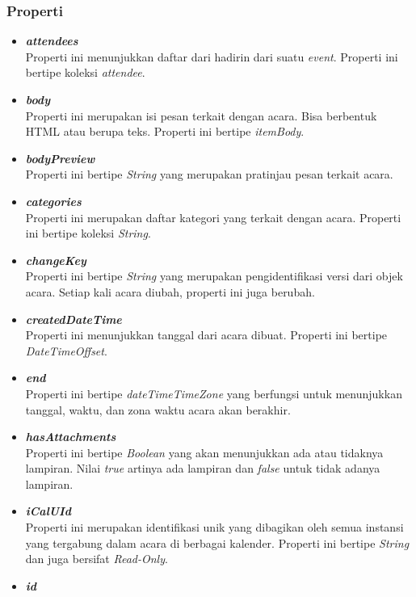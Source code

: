 \subsubsection{Properti}
\begin{itemize}
	\item \textbf{\textit{attendees}}\\
	Properti ini menunjukkan daftar dari hadirin dari suatu \textit{event}. Properti ini bertipe koleksi \textit{attendee}. 
	\item \textbf{\textit{body}}\\
	Properti ini merupakan isi pesan terkait dengan acara. Bisa berbentuk HTML atau berupa teks. Properti ini bertipe \textit{itemBody}. 
	\item \textbf{\textit{bodyPreview}}\\
	Properti ini bertipe \textit{String} yang merupakan pratinjau pesan terkait acara. 
	\item \textbf{\textit{categories}}\\
	Properti ini merupakan daftar kategori yang terkait dengan acara. Properti ini bertipe koleksi \textit{String}.
	\item \textbf{\textit{changeKey}}\\
	Properti ini bertipe \textit{String} yang merupakan pengidentifikasi versi dari objek acara. Setiap kali acara diubah, properti ini juga berubah. 
	\item \textbf{\textit{createdDateTime}}\\
	Properti ini menunjukkan tanggal dari acara dibuat. Properti ini bertipe \textit{DateTimeOffset}. 
	\item \textbf{\textit{end}}\\
	Properti ini bertipe \textit{dateTimeTimeZone} yang berfungsi untuk menunjukkan tanggal, waktu, dan zona waktu acara akan berakhir. 
	\item \textbf{\textit{hasAttachments}}\\
	Properti ini bertipe \textit{Boolean} yang akan menunjukkan ada atau tidaknya lampiran. Nilai \textit{true} artinya ada lampiran dan \textit{false} untuk tidak adanya lampiran. 
	\item \textbf{\textit{iCalUId}}\\
	Properti ini merupakan identifikasi unik yang dibagikan oleh semua instansi yang tergabung dalam acara di berbagai kalender. Properti ini bertipe \textit{String} dan juga bersifat \textit{Read-Only}. 
	\item \textbf{\textit{id}}\\

\end{itemize}
